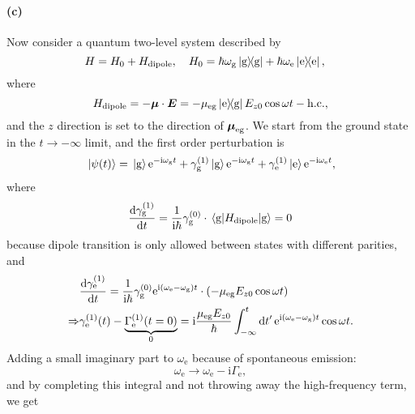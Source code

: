 \documentclass[hyperref, a4paper]{article}
\newcommand*{\ii}{\mathrm{i}}
\newcommand*{\ee}{\mathrm{e}}
\newcommand*{\Gammae}{\Gamma_{\text{e}}}
\newcommand*{\omegae}{\omega_{\text{e}}}
\newcommand*{\omegag}{\omega_{\text{g}}}
\begin{document}
\paragraph{(c)} Now consider a quantum two-level system described by 
\begin{equation}
    H = H_0 + H_{\text{dipole}}, \quad 
    H_0 = \hbar \omegag \dyad{\text{g}}
    + \hbar \omegae \dyad{\text{e}} , \quad 
\end{equation}
where
\begin{equation}
    H_{\text{dipole}} = - \vb*{\mu} \cdot \vb*{E} 
    = - \mu_{\text{eg}} \dyad{\text{e}}{\text{g}} E_{z0} \cos \omega t - \text{h.c.},
\end{equation}
and the $z$ direction is set to the direction of $\vb*{\mu}_{\text{eg}}$.
We start from the ground state in the $t \to - \infty$ limit, 
and the first order perturbation is 
\begin{equation}
    \ket*{\psi(t)} = \ket*{\text{g}} \ee^{- \ii \omegag t} 
    + \gamma^{(1)}_{\text{g}} \ket*{\text{g}} \ee^{- \ii \omegag t} 
    + \gamma^{(1)}_{\text{e}} \ket*{\text{e}} \ee^{- \ii \omegae t} ,
    \label{eq:first-pt-wave-function}
\end{equation}
where 
\begin{equation}
    \dv{\gamma^{(1)}_{\text{g}}}{t} = \frac{1}{\ii \hbar} \gamma^{(0)}_{\text{g}} \cdot \expval*{H_{\text{dipole}}}{\text{g}} = 0
\end{equation}
because dipole transition is only allowed between states with different parities, and 
\begin{equation}
    \begin{aligned}
        &\dv{\gamma_\text{e}^{(1)}}{t} = \frac{1}{\ii \hbar} 
        \gamma_{\text{g}}^{(0)} \ee^{\ii (\omegae - \omegag) t} 
        \cdot (- \mu_{\text{eg}} E_{z0} \cos \omega t ) \\
        \Rightarrow & 
        \gamma^{(1)}_{\text{e}}(t) - \underbrace{
            \Gammae^{(1)}(t=0)
        }_{0} = \ii \frac{\mu_{\text{eg}} E_{z0}}{\hbar} 
        \int_{- \infty}^{t} \dd{t'} \ee^{\ii (\omegae - \omegag) t}  \cos \omega t  .
    \end{aligned}
\end{equation}
Adding a small imaginary part to $\omegae$ because of spontaneous emission:
\begin{equation}
    \omegae \to \omegae - \ii \Gammae,
\end{equation}
and by completing this integral 
and not throwing away the high-frequency term, 
we get 
\end{document}
